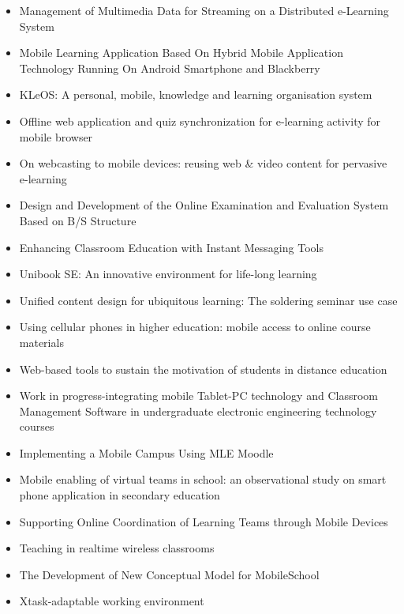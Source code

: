 \begin{itemize}
    \item Management of Multimedia Data for Streaming on a Distributed e-Learning System \cite{hayakawa_management_2012}
    \item Mobile Learning Application Based On Hybrid Mobile Application Technology Running On Android Smartphone and Blackberry \cite{setiabudi_mobile_2013}
    \item KLeOS: A personal, mobile, knowledge and learning organisation system \cite{vavoula_kleos:_2002}
    \item Offline web application and quiz synchronization for e-learning activity for mobile browser \cite{ijtihadie_offline_2010}
    \item On webcasting to mobile devices: reusing web \& video content for pervasive e-learning \cite{turro_webcasting_2007}
    \item Design and Development of the Online Examination and Evaluation System Based on B/S Structure \cite{li_design_2007}
    \item Enhancing Classroom Education with Instant Messaging Tools \cite{yao_enhancing_2011}
    \item Unibook SE: An innovative environment for life-long learning \cite{chimos_unibook_2012}
    \item Unified content design for ubiquitous learning: The soldering seminar use case \cite{rodriguez-alsina_unified_2010}
    \item Using cellular phones in higher education: mobile access to online course materials \cite{mermelstein_using_2005}
    \item Web-based tools to sustain the motivation of students in distance education \cite{tokiwa_web-based_2009}
    \item Work in progress-integrating mobile Tablet-PC technology and Classroom Management Software in undergraduate electronic engineering technology courses \cite{rawat_work_2008}
    \item Implementing a Mobile Campus Using MLE Moodle \cite{xhafa_implementing_2010}
    \item Mobile enabling of virtual teams in school: an observational study on smart phone application in secondary education \cite{schmiedl_mobile_2010}
    \item Supporting Online Coordination of Learning Teams through Mobile Devices \cite{roig-torres_supporting_2012}
    \item Teaching in realtime wireless classrooms \cite{griffioen_teaching_1998}
    \item The Development of New Conceptual Model for MobileSchool \cite{hashim_development_2012}
    \item Xtask-adaptable working environment \cite{ketamo_xtask-adaptable_2002}
\end{itemize}

